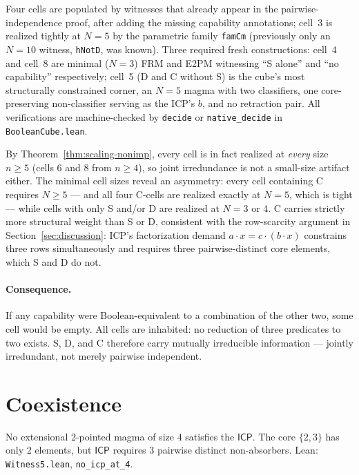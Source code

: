 \documentclass[sigconf,screen]{acmart}
\newcommand{\dotop}{\cdot}
\newcommand{\ICP}{\textsf{ICP}}
\theoremstyle{remark}
\begin{document}
Four cells are populated by witnesses that already appear in the pairwise-independence proof, after adding the missing capability annotations; cell~3 is realized tightly at $N\!=\!5$ by the parametric family \texttt{famCm} (previously only an $N\!=\!10$ witness, \texttt{hNotD}, was known). Three required fresh constructions: cell~4 and cell~8 are minimal ($N\!=\!3$) FRM and E2PM witnessing ``S alone'' and ``no capability'' respectively; cell~5 (D and C without S) is the cube's most structurally constrained corner, an $N\!=\!5$ magma with two classifiers, one core-preserving non-classifier serving as the ICP's $b$, and no retraction pair. All verifications are machine-checked by \texttt{decide} or \texttt{native\_decide} in \texttt{BooleanCube.lean}.

By Theorem~\ref{thm:scaling-nonimp}, every cell is in fact realized at \emph{every} size $n \geq 5$ (cells 6 and 8 from $n \geq 4$), so joint irredundance is not a small-size artifact either. The minimal cell sizes reveal an asymmetry: every cell containing C requires $N \geq 5$ --- and all four C-cells are realized exactly at $N = 5$, which is tight --- while cells with only S and/or D are realized at $N = 3$ or $4$. C carries strictly more structural weight than S or D, consistent with the row-scarcity argument in Section~\ref{sec:discussion}: ICP's factorization demand $a \dotop x = c \dotop (b \dotop x)$ constrains three rows simultaneously and requires three pairwise-distinct core elements, which S and D do not.

\paragraph{Consequence.}
If any capability were Boolean-equivalent to a combination of the other two, some cell would be empty. All cells are inhabited: no reduction of three predicates to two exists. S, D, and C therefore carry mutually irreducible information — jointly irredundant, not merely pairwise independent.

\section{Coexistence}
\label{sec:bound}

\begin{theorem}[No ICP at $N\!=\!4$]
\label{thm:no-icp-4}
No extensional 2-pointed magma of size $4$ satisfies the $\ICP$. The core $\{2,3\}$ has only 2 elements, but $\ICP$ requires 3 pairwise distinct non-absorbers. Lean: \texttt{Witness5.lean}, \texttt{no\_icp\_at\_4}.
\end{theorem}
\end{document}
